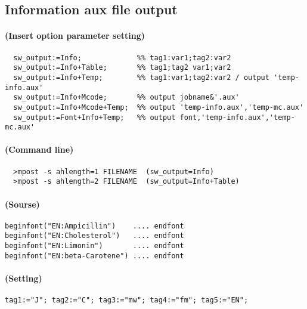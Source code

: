 \documentclass[a4paper]{article}
\begin{document}
\subsection{Information aux file output}
\paragraph{(Insert option parameter setting)}
%
%
%
%
%
%
%
%
%
%
%
%
%
%
%
%
%
\begin{verbatim}
  sw_output:=Info;             %% tag1:var1;tag2:var2
  sw_output:=Info+Table;       %% tag1;tag2 var1;var2
  sw_output:=Info+Temp;        %% tag1:var1;tag2:var2 / output 'temp-info.aux'
  sw_output:=Info+Mcode;       %% output jobname&'.aux'
  sw_output:=Info+Mcode+Temp;  %% output 'temp-info.aux','temp-mc.aux'
  sw_output:=Font+Info+Temp;   %% output font,'temp-info.aux','temp-mc.aux'
\end{verbatim}
\paragraph{(Command line)}
\begin{verbatim}
  >mpost -s ahlength=1 FILENAME  (sw_output=Info)
  >mpost -s ahlength=2 FILENAME  (sw_output=Info+Table)
\end{verbatim}
\paragraph{(Sourse)}
\begin{verbatim}
beginfont("EN:Ampicillin")    .... endfont
beginfont("EN:Cholesterol")   .... endfont
beginfont("EN:Limonin")       .... endfont
beginfont("EN:beta-Carotene") .... endfont
\end{verbatim}
\paragraph{(Setting)}
\begin{verbatim}
tag1:="J"; tag2:="C"; tag3:="mw"; tag4:="fm"; tag5:="EN";
\end{verbatim}
\end{document}
